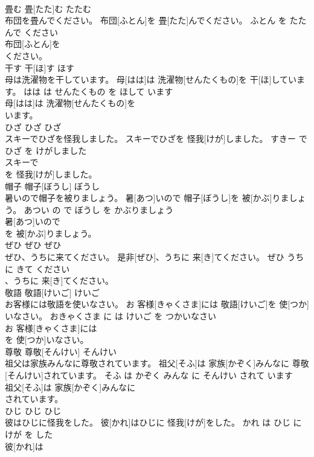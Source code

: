 \documentclass[8pt]{extreport}
\begin{document}
\begin{CJK}{UTF8}{min}
\\	畳む	畳[たた]む	たたむ	
\\	布団を畳んでください。	布団[ふとん]を 畳[たた]んでください。	ふとん を たたんで ください	
\\	布団[ふとん]を
\\	ください。		
\\	干す	干[ほ]す	ほす	
\\	母は洗濯物を干しています。	母[はは]は 洗濯物[せんたくもの]を 干[ほ]しています。	はは は せんたくもの を ほして います	
\\	母[はは]は 洗濯物[せんたくもの]を
\\	います。		
\\	ひざ	ひざ	ひざ	
\\	スキーでひざを怪我しました。	スキーでひざを 怪我[けが]しました。	すきー で ひざ を けがしました	
\\	スキーで
\\	を 怪我[けが]しました。		
\\	帽子	帽子[ぼうし]	ぼうし	
\\	暑いので帽子を被りましょう。	暑[あつ]いので 帽子[ぼうし]を 被[かぶ]りましょう。	あつい の で ぼうし を かぶりましょう	
\\	暑[あつ]いので
\\	を 被[かぶ]りましょう。		
\\	ぜひ	ぜひ	ぜひ	
\\	ぜひ、うちに来てください。	是非[ぜひ]、うちに 来[き]てください。	ぜひ うち に きて ください	
\\	、うちに 来[き]てください。		
\\	敬語	敬語[けいご]	けいご	
\\	お客様には敬語を使いなさい。	お 客様[きゃくさま]には 敬語[けいご]を 使[つか]いなさい。	おきゃくさま に は けいご を つかいなさい	
\\	お 客様[きゃくさま]には
\\	を 使[つか]いなさい。		
\\	尊敬	尊敬[そんけい]	そんけい	
\\	祖父は家族みんなに尊敬されています。	祖父[そふ]は 家族[かぞく]みんなに 尊敬[そんけい]されています。	そふ は かぞく みんな に そんけい されて います	
\\	祖父[そふ]は 家族[かぞく]みんなに
\\	されています。		
\\	ひじ	ひじ	ひじ	
\\	彼はひじに怪我をした。	彼[かれ]はひじに 怪我[けが]をした。	かれ は ひじ に けが を した	
\\	彼[かれ]は

\end{CJK}
\end{document}
